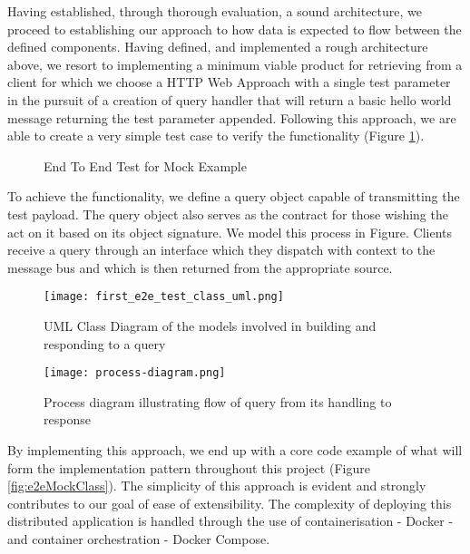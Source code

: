 Having established, through thorough evaluation, a sound architecture, we proceed to establishing our approach to how data is expected to flow between the defined components. Having defined, and implemented a rough architecture above, we resort to implementing a minimum viable product for retrieving from a client for which we choose a HTTP Web Approach with a single test parameter in the pursuit of a creation of query handler that will return a basic hello world message returning the test parameter appended. Following this approach, we are able to create a very simple test case to verify the functionality (Figure \ref{fig:e2eMockTest}).

\begin{figure}[h!]
		\centering
		
		\caption{End To End Test for Mock Example}
		\label{fig:e2eMockTest}
\end{figure}

To achieve the functionality, we define a query object capable of transmitting the test payload. The query object also serves as the contract for those wishing the act on it based on its object signature. We model this process in Figure. Clients receive a query through an interface which they dispatch with context to the message bus and which is then returned from the appropriate source. 

\begin{figure}[h!]
	\centering
	\texttt{[image: first\_e2e\_test\_class\_uml.png]}
	\caption{UML Class Diagram of the models involved in building and responding to a query}
	\label{fig:firste2etestclassuml}
\end{figure}

\begin{figure}[h!]
	\centering
	\texttt{[image: process-diagram.png]}
	\caption{Process diagram illustrating flow of query from its handling to response}
	\label{fig:processSequenceQueryFlow}
\end{figure}

By implementing this approach, we end up with a core code example of what will form the implementation pattern throughout this project (Figure \ref{fig:e2eMockClass}). The simplicity of this approach is evident and strongly contributes to our goal of ease of extensibility. The complexity of deploying this distributed application is handled through the use of containerisation - Docker - and container orchestration - Docker Compose. 


